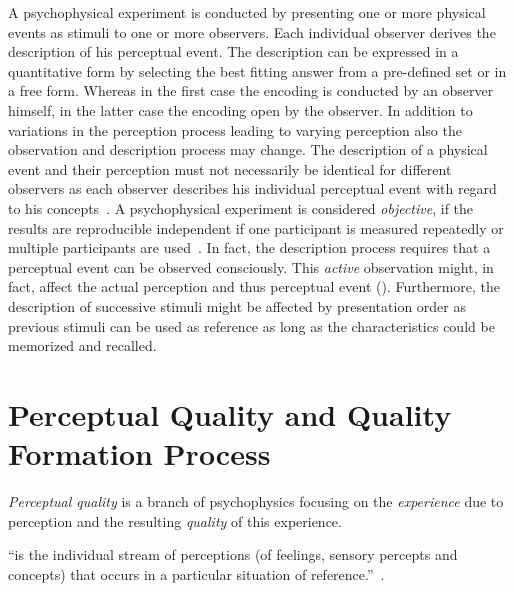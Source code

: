 A psychophysical experiment is conducted by presenting one or more physical events as stimuli to one or more observers.
Each individual observer derives the description of his perceptual event.
The description can be expressed in a quantitative form by selecting the best fitting answer from a pre-defined set or in a free form.
Whereas in the first case the encoding is conducted by an observer himself, in the latter case the encoding open by the observer.
In addition to variations in the perception process leading to varying perception also the observation and description process may change.
The description of a physical event and their perception must not necessarily be identical for different observers as each observer describes his individual perceptual event with regard to his concepts~\citep[p. 11]{blauert_spatial_1996}.
A psychophysical experiment is considered \emph{objective}, if the results are reproducible independent if one participant is measured repeatedly or multiple participants are used~\citep[p. 11]{blauert_spatial_1996}.
In fact, the description process requires that a perceptual event can be observed consciously.
This \emph{active} observation might, in fact, affect the actual perception and thus perceptual event (\citet{moller_quality_2014}).
Furthermore, the description of successive stimuli might be affected by presentation order as previous stimuli can be used as reference as long as the characteristics could be memorized and recalled.

\section{Perceptual Quality and Quality Formation Process}
\emph{Perceptual quality} is a branch of psychophysics focusing on the \emph{experience} due to perception and the resulting \emph{quality} of this experience.
\begin{definition}[Experiencing]
``is the individual stream of perceptions (of feelings, sensory percepts and concepts) that occurs in a particular situation of reference.''~\citep[p. 13]{moller_quality_2014}.
\end{definition}

